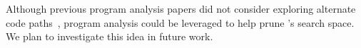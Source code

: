 Although previous program analysis papers did not consider
exploring alternate code
paths~\cite{Lee:2011:TGR:1993498.1993528,tallam2007enabling,huang2012lean,cai2013lock,elyasov2013guided,wang2015fast},
program analysis could be leveraged to help prune \sys's search space. We plan
to investigate this idea in future work.

%
%
%

